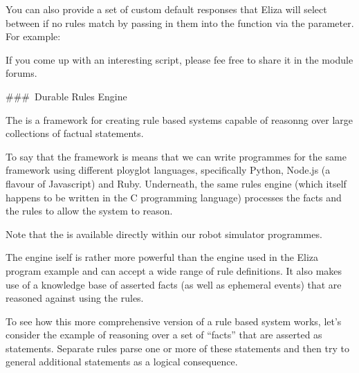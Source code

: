 \documentclass[letterpaper,10pt,english]{sphinxmanual}
\begin{document}
{You can also provide a set of custom default responses that Eliza will select between if no rules match by passing in them into the  function via the  parameter. For example:

\begin{sphinxVerbatim}[commandchars=\\\{\}]
                     \PYG{p}{[}
                              \PYG{p}{]}
\end{sphinxVerbatim}

If you come up with an interesting script, please fee free to share it in the module forums.

\#\#\# Durable Rules Engine

The  is a  framework for creating rule based systems capable of reasonng over large collections of factual statements.

To say that the framework is  means that we can write programmes for the same framework using different ployglot languages, specifically Python, Node.js (a flavour of Javascript) and Ruby. Underneath, the same rules engine (which itself happens to be written in the C programming language) processes the facts and the rules to allow the system to reason.

Note that the  is  available directly within our robot simulator programmes.

The engine iself is rather more powerful than the engine used in the Eliza program example and can accept a wide range of rule definitions. It also makes use of a knowledge base of asserted facts (as well as ephemeral events) that are reasoned against using the rules.

To see how this more comprehensive version of a rule based system works, let’s consider the example of reasoning over a set of “facts” that are asserted as  statements. Separate rules parse one or more of these statements and then try to general additional statements as a logical consequence.

}
\end{document}
